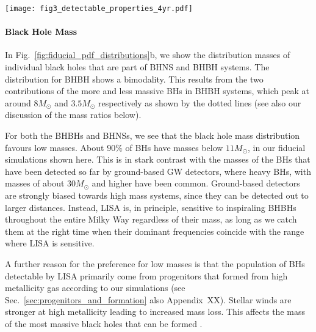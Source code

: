 \begin{figure*}[t]
    \centering
    \texttt{[image: fig3\_detectable\_properties\_4yr.pdf]}
    \caption{Properties of detectable systems for a 4-year LISA mission in our fiducial model. Each panel shows a kernel density estimator for a single property, coloured by DCO type. The shaded areas show the 1- and 2-$\sigma$ uncertainties (obtained via bootstrapping). The dotted lines in the black hole mass panel show the individual primary and secondary mass distributions. See Sec.~\ref{sec:fiducial_distributions} for a discussion. \href{https://github.com/TomWagg/detecting-DCOs-in-LISA/blob/main/paper/figures/fig3_detectable_properties_4yr.pdf}{\faFileImage} \href{https://github.com/TomWagg/detecting-DCOs-in-LISA/blob/main/paper/figure_notebooks/fiducial.ipynb}{\faBook}.}
    \label{fig:fiducial_pdf_distributions}
\end{figure*}

\paragraph{Black Hole Mass}
In Fig.~\ref{fig:fiducial_pdf_distributions}b, we show the distribution masses of individual black holes that are part of BHNS and BHBH systems. 
The distribution for BHBH shows a bimodality. This results from the two contributions of the more and less massive BHs in BHBH systems, which peak at around $8 \unit{M_{\odot}}$ and $3.5 \unit{M_{\odot}}$ respectively as shown by the dotted lines (see also our discussion of the mass ratios below).

For both the BHBHs and BHNSs, we see that the black hole mass distribution favours low masses. About $90\%$ of BHs have masses below $11 \unit{M_{\odot}}$, in our fiducial simulations shown here. This is in stark contrast with the masses of the BHs that have been detected so far by ground-based GW detectors, where heavy BHs, with masses of about $30\unit{M_{\odot}}$ and higher have been common. Ground-based detectors are strongly biased towards high mass systems, since they can be detected out to larger distances. Instead, LISA is, in principle, sensitive to inspiraling BHBHs throughout the entire Milky Way regardless of their mass, as long as we catch them at the right time when their dominant frequencies coincide with the range where LISA is sensitive.

A further reason for the preference for low masses is that the population of BHs detectable by LISA primarily come from progenitors that formed from high metallicity gas according to our simulations (see Sec.~\ref{sec:progenitors_and_formation} also Appendix~XX). Stellar winds are stronger at high metallicity leading to increased mass loss. This affects the mass of the most massive black holes that can be formed \citep{Belczynski+2010}. 

